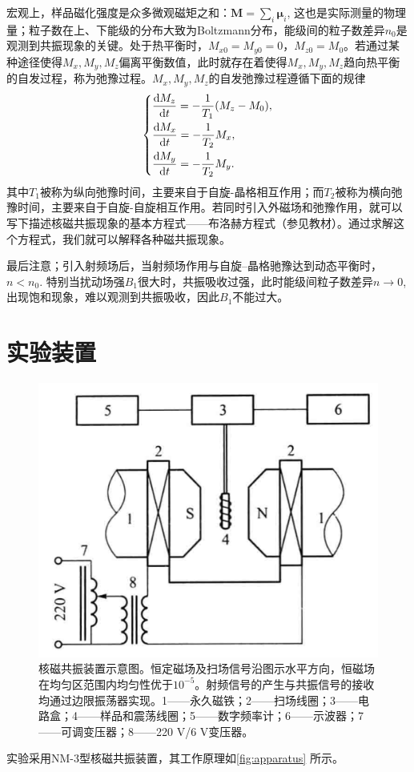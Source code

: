 \documentclass[font=default]{mpltx}
\begin{document}
宏观上，样品磁化强度是众多微观磁矩之和：$\bm{M} = \sum_i \bm{\mu}_i$, 这也是实际测量的物理量；粒子数在上、下能级的分布大致为Boltzmann分布，能级间的粒子数差异$n_0$是观测到共振现象的关键。处于热平衡时，$M_{x0}=M_{y0}=0$，$M_{z0}=M_0$。若通过某种途径使得$M_{x},M_{y},M_{z}$偏离平衡数值，此时就存在着使得$M_{x},M_{y},M_{z}$趋向热平衡的自发过程，称为弛豫过程。$M_{x},M_{y},M_{z}$的自发弛豫过程遵循下面的规律
\begin{equation}
  \left\{\begin{aligned}
    &\frac{{\rm d} M_z}{{\rm d} t}=-\frac{1}{T_1}(M_z-M_0),\\
    &\frac{{\rm d} M_x}{{\rm d} t}=-\frac{1}{T_2}M_x,\\
    &\frac{{\rm d} M_y}{{\rm d} t}=-\frac{1}{T_2}M_y.
  \end{aligned}\right.
\end{equation}其中$T_1$被称为纵向弛豫时间，主要来自于自旋-晶格相互作用；而$T_2$被称为横向弛豫时间，主要来自于自旋-自旋相互作用。若同时引入外磁场和弛豫作用，就可以写下描述核磁共振现象的基本方程式——布洛赫方程式（参见教材\cite{book}）。通过求解这个方程式，我们就可以解释各种磁共振现象。
	
最后注意；引入射频场后，当射频场作用与自旋--晶格驰豫达到动态平衡时，$n < n_0$. 特别当扰动场强$B_1$很大时，共振吸收过强，此时能级间粒子数差异$n\to 0$, 出现饱和现象，难以观测到共振吸收，因此$B_1$不能过大。

\section{实验装置}
\begin{figure}
\centering
\includegraphics[width=0.4\linewidth]{fig/apparatus.png}
\caption{核磁共振装置示意图。恒定磁场及扫场信号沿图示水平方向，恒磁场在均匀区范围内均匀性优于$10^{-5}$。射频信号的产生与共振信号的接收均通过边限振荡器实现。1——永久磁铁；2——扫场线圈；3——电路盒；4——样品和震荡线圈；5——数字频率计；6——示波器；7——可调变压器；8——220 V/6 V变压器。}
\label{fig:apparatus}
\end{figure}

实验采用NM-3型核磁共振装置，其工作原理如\autoref{fig:apparatus} 所示。
\end{document}
